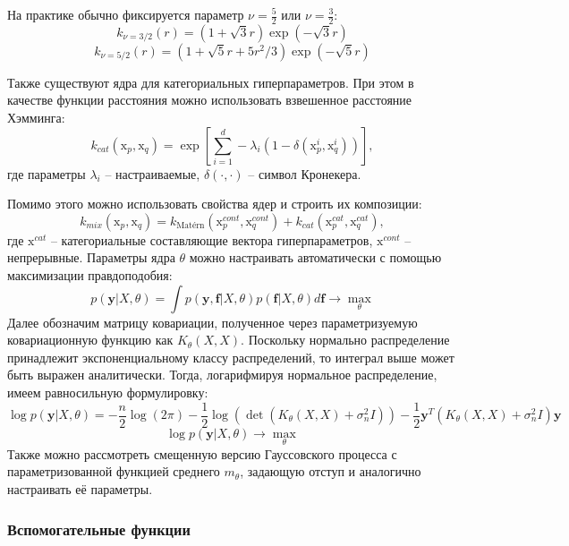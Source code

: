 \documentclass[12pt,fleqn]{article}
\begin{document}
На практике обычно фиксируется параметр $\nu = \frac{5}{2}$ или $\nu = \frac{3}{2}$:
$$
    k_{\nu=3/2}(r) = \left(1 + \sqrt{3}r\right)\exp\left(-\sqrt{3}r\right)
$$
$$
    k_{\nu=5/2}(r) = \left(1 + \sqrt{5}r + 5r^2/3\right)\exp\left(-\sqrt{5}r\right)
$$

Также существуют ядра для категориальных гиперпараметров. При этом в качестве функции расстояния можно использовать взвешенное расстояние Хэмминга\cite{10.1007/978-3-642-25566-3_40}:
$$
    k_{cat}(\boldsymbol{\mathrm{x}}_p, \boldsymbol{\mathrm{x}}_q) = \exp\left[\sum_{i=1}^{d} -\lambda_i(1 - \delta(\boldsymbol{\mathrm{x}}^{i}_{p}, \boldsymbol{\mathrm{x}}^{i}_{q}))\right],
$$
где параметры $\lambda_i$ -- настраиваемые, $\delta(\cdot, \cdot)$ -- символ Кронекера. 

Помимо этого можно использовать свойства ядер и строить их композиции:
$$
    k_{mix}(\boldsymbol{\mathrm{x}}_p, \boldsymbol{\mathrm{x}}_q) = k_{\text{Matérn}}(\boldsymbol{\mathrm{x}}_p^{cont}, \boldsymbol{\mathrm{x}}_q^{cont}) + k_{cat}(\boldsymbol{\mathrm{x}}_p^{cat}, \boldsymbol{\mathrm{x}}_q^{cat}), 
$$
где $\boldsymbol{\mathrm{x}}^{cat}$ -- категориальные составляющие вектора гиперпараметров, $\boldsymbol{\mathrm{x}}^{cont}$ -- непрерывные.
Параметры ядра $\theta$ можно настраивать автоматически с помощью максимизации правдоподобия:
$$
    p(\boldsymbol{y}|X, \theta) = \int p(\boldsymbol{y}, \boldsymbol{f} | X, \theta) p(\boldsymbol{f} | X, \theta) d\boldsymbol{f} \longrightarrow \max_{\theta}
$$
Далее обозначим матрицу ковариации, полученное через параметризуемую ковариационную функцию как $K_\theta(X, X)$. Поскольку нормально распределение принадлежит экспоненциальному классу распределений, то интеграл выше может быть выражен аналитически. Тогда, логарифмируя нормальное распределение, имеем равносильную формулировку:
$$
    \log p(\boldsymbol{y} | X, \theta) = -\frac{n}{2} \log({2\pi}) - \frac{1}{2}\log\left(\det\left(K_{\theta}(X, X) + \sigma_n^2I\right)\right) -\frac{1}{2} \boldsymbol{y}^T(K_{\theta}(X, X) + \sigma_n^2I)\boldsymbol{y}
$$
$$
    \log p(\boldsymbol{y} | X, \theta) \longrightarrow \max_{\theta}
$$
Также можно рассмотреть смещенную версию Гауссовского процесса с параметризованной функцией среднего $m_{\theta}$, задающую отступ и аналогично настраивать её параметры.


\subsubsection{Вспомогательные функции}
\end{document}
